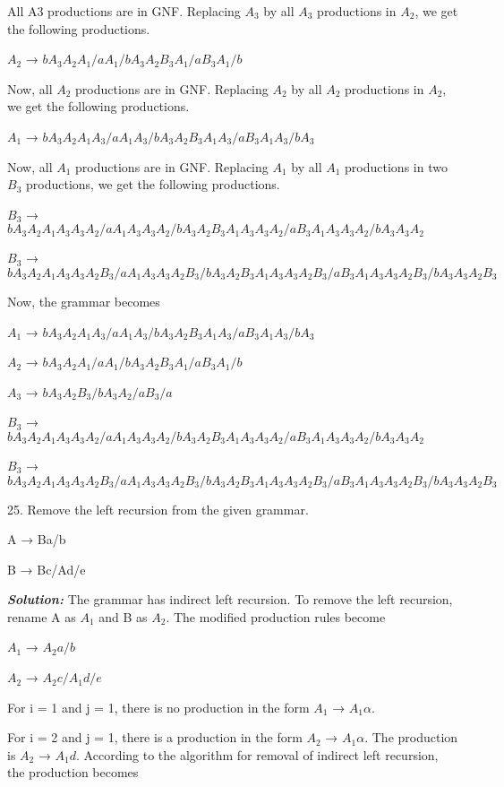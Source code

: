 \documentclass{article}
\begin{document}
All A3 productions are in GNF. Replacing $A_3$ by all $A_3$ productions in $A_2$, we get the following productions. 

$A_2$ → $bA_3A_2A_1/aA_1/bA_3A_2B_3A_1/aB_3A_1/b$ 

Now, all $A_2$ productions are in GNF. Replacing $A_2$ by all $A_2$ productions in $A_2$, we get the following productions. 

$A_1$ → $bA_3A_2A_1A_3/aA_1A_3/bA_3A_2B_3A_1A_3/aB_3A_1A_3/bA_3$ 

Now, all $A_1$ productions are in GNF. Replacing $A_1$ by all $A_1$ productions in two $B_3$ productions, we get the following productions. 

$B_3$ → $bA_3A_2A_1A_3A_3A_2/aA_1A_3A_3A_2/bA_3A_2B_3A_1A_3A_3A_2/aB_3A_1A_3A_3A_2/bA_3A_3A_2$ 

$B_3$ → $bA_3A_2A_1A_3A_3A_2B_3/aA_1A_3A_3A_2B_3/bA_3A_2B_3A_1A_3A_3A_2B_3/aB_3A_1A_3A_3A_2B_3/bA_3A_3A_2B_3$

Now, the grammar becomes 

$A_1$ → $bA_3A_2A_1A_3/aA_1A_3/bA_3A_2B_3A_1A_3/aB_3A_1A_3/bA_3$ 

$A_2$ → $bA_3A_2A_1/aA_1/bA_3A_2B_3A_1/aB_3A_1/b$ 

$A_3$ → $bA_3A_2B_3/bA_3A_2/aB_3/a$ 

$B_3$ → $bA_3A_2A_1A_3A_3A_2/aA_1A_3A_3A_2/bA_3A_2B_3A_1A_3A_3A_2/aB_3A_1A_3A_3A_2/bA_3A_3A_2$ 

$B_3$ → $bA_3A_2A_1A_3A_3A_2B_3/aA_1A_3A_3A_2B_3/bA_3A_2B_3A_1A_3A_3A_2B_3/aB_3A_1A_3A_3A_2B_3/bA_3A_3A_2B_3$ 

25. Remove the left recursion from the given grammar.

\hspace*{5cm} A → Ba/b 

\hspace*{5cm} B → Bc/Ad/e 

\textit{\textbf{Solution:}} The grammar has indirect left recursion. To remove the left recursion, rename A as $A_1$ and B as $A_2$. The modiﬁed production rules become 

\hspace*{5cm} $A_1$ → $A_2a/b$ 

\hspace*{5cm} $A_2$ → $A_2c/A_1d/e$ 

For i = 1 and j = 1, there is no production in the form $A_1$ → $A_1\alpha$. 

For i = 2 and j = 1, there is a production in the form $A_2$ → $A_1\alpha$. The production is $A_2$ → $A_1d$. According to the algorithm for removal of indirect left recursion, the production becomes 
\end{document}
